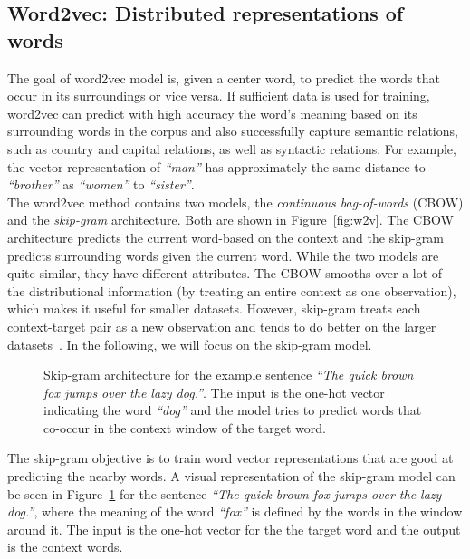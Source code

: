 \subsection{Word2vec: Distributed representations of words}
\label{subsec:word2vec}
The goal of word2vec model is, given a center word, to predict the words that occur in its surroundings or vice versa. If sufficient data is used for training, word2vec can predict with high accuracy the word's meaning based on its surrounding words in the corpus and also successfully capture semantic relations, such as country and capital relations, as well as syntactic relations. For example, the vector representation of  \emph{``man''} has approximately the same distance to \emph{``brother''} as \emph{``women''} to \emph{``sister''}. \\
The word2vec method contains two models, the \emph{continuous bag-of-words} (CBOW) and the \emph{skip-gram} architecture. Both are shown in Figure~\ref{fig:w2v}. The CBOW architecture predicts the current word-based on the context and the skip-gram predicts surrounding words given the current word. While the two models are quite similar, they have different attributes. The CBOW smooths over a lot of the distributional information (by treating an entire context as one observation), which makes it useful for smaller datasets. However, skip-gram treats each context-target pair as a new observation and tends to do better on the larger datasets~. In the following, we will focus on the skip-gram model. \\
\begin{figure}
\centering 
\resizebox{0.8\textwidth}{0.5\textwidth}{      

}
\caption{Skip-gram architecture for the example sentence \emph{``The quick brown fox jumps over the lazy dog.''}. The input is the one-hot vector indicating the word \emph{``dog''} and the model tries to predict words that co-occur in the context window of the target word.  }
\label{fig:skip_w2v}
\end{figure}
\noindent
The skip-gram objective is to train word vector representations that are good at predicting the nearby words. A visual representation of the skip-gram model can be seen in Figure~\ref{fig:skip_w2v} for the sentence \emph{``The quick brown fox jumps over the lazy dog.''}, where the meaning of the word \emph{``fox''} is defined by the words in the window around it. The input is the one-hot vector for the the target word and the output is the context words.\\
